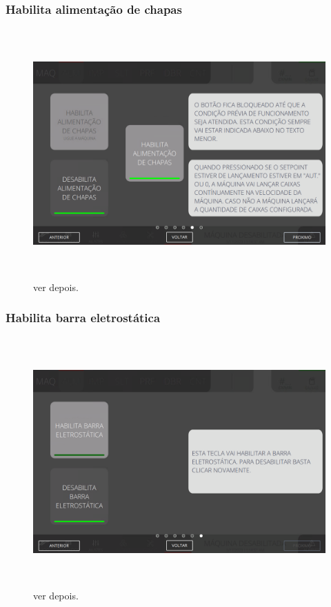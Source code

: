 \newpage
\thispagestyle{fancy}
\vspace*{\fill}
\subsubsection{\small{Habilita alimentação de chapas}}
\begin{figure}[h]
  \centering
  \includegraphics[width=576px,height=360px]{src/imagesFlexo/03-feeder/commands/e-5.png}
  \caption{ver depois.}
   \label{}
\end{figure}
\vspace*{\fill}

\newpage
\thispagestyle{fancy}
\vspace*{\fill}
\subsubsection{\small{Habilita barra eletrostática}}
\begin{figure}[h]
  \centering
  \includegraphics[width=576px,height=360px]{src/imagesFlexo/03-feeder/commands/e-6.png}
  \caption{ver depois.}
   \label{}
\end{figure}
\vspace*{\fill}